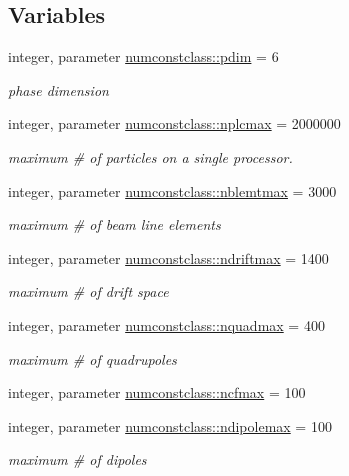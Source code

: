 \subsection*{Variables}
\begin{DoxyCompactItemize}
\item 
integer, parameter \mbox{\hyperlink{namespacenumconstclass_a24da80ebccca40a65c454aff1bd28e7f}{numconstclass\+::pdim}} = 6
\begin{DoxyCompactList}\small\item\em phase dimension \end{DoxyCompactList}\item 
integer, parameter \mbox{\hyperlink{namespacenumconstclass_a6bb8beba48502784bfcd08114a616b9b}{numconstclass\+::nplcmax}} = 2000000
\begin{DoxyCompactList}\small\item\em maximum \# of particles on a single processor. \end{DoxyCompactList}\item 
integer, parameter \mbox{\hyperlink{namespacenumconstclass_a83ab51ec1dd55c167600999fca072524}{numconstclass\+::nblemtmax}} = 3000
\begin{DoxyCompactList}\small\item\em maximum \# of beam line elements \end{DoxyCompactList}\item 
integer, parameter \mbox{\hyperlink{namespacenumconstclass_a22030f070a90c877bef951b411dac428}{numconstclass\+::ndriftmax}} = 1400
\begin{DoxyCompactList}\small\item\em maximum \# of drift space \end{DoxyCompactList}\item 
integer, parameter \mbox{\hyperlink{namespacenumconstclass_a93ef59ed830442249dee14d677ddeb08}{numconstclass\+::nquadmax}} = 400
\begin{DoxyCompactList}\small\item\em maximum \# of quadrupoles \end{DoxyCompactList}\item 
integer, parameter \mbox{\hyperlink{namespacenumconstclass_a94e49bcdcfdd3ed05de0d41af396f4d1}{numconstclass\+::ncfmax}} = 100
\item 
integer, parameter \mbox{\hyperlink{namespacenumconstclass_a35f5d91828a6dc16c619583554a1566d}{numconstclass\+::ndipolemax}} = 100
\begin{DoxyCompactList}\small\item\em maximum \# of dipoles \end{DoxyCompactList}\item 

\end{DoxyCompactItemize}
